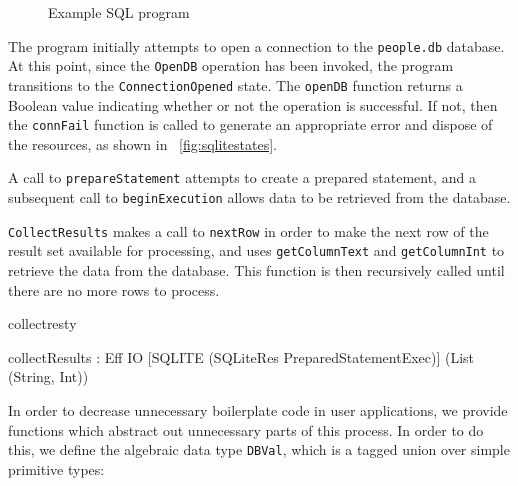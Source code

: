 \begin{figure}[h]
\caption{Example SQL program}
\label{fig:testsel}
\end{figure}

The program initially attempts to open a connection to the \texttt{people.db}
database. At this point, since the \texttt{OpenDB} operation has been invoked,
the program transitions to the \texttt{ConnectionOpened} state. The
\texttt{openDB} function returns a Boolean value indicating whether or not the
operation is successful. If not, then the \texttt{connFail} function is called
to generate an appropriate error and dispose of the resources, as shown in
~\ref{fig:sqlitestates}.

A call to \texttt{prepareStatement} attempts to create a prepared statement,
and a subsequent call to \texttt{beginExecution} allows data to be retrieved
from the database.

\texttt{CollectResults} makes a call to
\texttt{nextRow} in order to make the next row of the result set available for
processing, and uses \texttt{getColumnText} and \texttt{getColumnInt}
to retrieve the data from the database. This function is then
recursively called until there are no more rows to process.

\begin{SaveVerbatim}{collectresty}

collectResults : Eff IO 
            [SQLITE (SQLiteRes PreparedStatementExec)] 
            (List (String, Int))
\end{SaveVerbatim}


\noindent
{}

\noindent
{}

In order to decrease unnecessary boilerplate code in user applications, we
provide functions which abstract out unnecessary parts of this process. In
order to do this, we define the algebraic data type \texttt{DBVal}, which is a
tagged union over simple primitive types:

